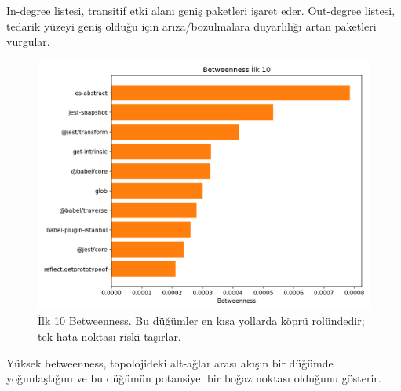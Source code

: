 \documentclass[11pt,a4paper]{article}
\begin{document}
\noindent In-degree listesi, transitif etki alanı geniş paketleri işaret eder. Out-degree listesi, tedarik yüzeyi geniş olduğu için arıza/bozulmalara duyarlılığı artan paketleri vurgular.

\begin{figure}[H]
  \centering
  \includegraphics{top10_betweenness.png}
  \caption{İlk 10 Betweenness. Bu düğümler en kısa yollarda köprü rolündedir; tek hata noktası riski taşırlar.}
\end{figure}

\noindent Yüksek betweenness, topolojideki alt-ağlar arası akışın bir düğümde yoğunlaştığını ve bu düğümün potansiyel bir boğaz noktası olduğunu gösterir.
\end{document}
